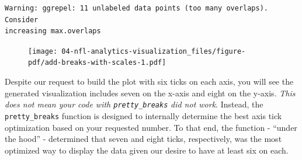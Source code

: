\documentclass[
  letterpaper,
]{krantz}
\newenvironment{Shaded}{\begin{snugshade}}{\end{snugshade}}
\newcommand{\AttributeTok}[1]{\textcolor[rgb]{0.40,0.45,0.13}{#1}}
\newcommand{\DecValTok}[1]{\textcolor[rgb]{0.68,0.00,0.00}{#1}}
\newcommand{\FloatTok}[1]{\textcolor[rgb]{0.68,0.00,0.00}{#1}}
\newcommand{\FunctionTok}[1]{\textcolor[rgb]{0.28,0.35,0.67}{#1}}
\newcommand{\NormalTok}[1]{\textcolor[rgb]{0.00,0.23,0.31}{#1}}
\newcommand{\SpecialCharTok}[1]{\textcolor[rgb]{0.37,0.37,0.37}{#1}}
\newcommand{\StringTok}[1]{\textcolor[rgb]{0.13,0.47,0.30}{#1}}
\begin{document}
\begin{Shaded}
\end{Shaded}

\begin{verbatim}
Warning: ggrepel: 11 unlabeled data points (too many overlaps). Consider
increasing max.overlaps
\end{verbatim}

\begin{figure}[H]

{\centering \texttt{[image: 04-nfl-analytics-visualization\_files/figure-pdf/add-breaks-with-scales-1.pdf]}

}

\end{figure}

Despite our request to build the plot with six ticks on each axis, you
will see the generated visualization includes seven on the x-axis and
eight on the y-axis. \emph{This does not mean your code with
\texttt{pretty\_breaks}} \emph{did not work}. Instead, the
\texttt{pretty\_breaks} function is designed to internally determine the
best axis tick optimization based on your requested number. To that end,
the function - ``under the hood'' - determined that seven and eight
ticks, respectively, was the most optimized way to display the data
given our desire to have at least six on each.
\end{document}
